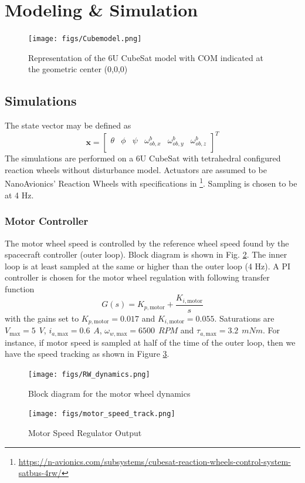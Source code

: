 \section{Modeling \& Simulation} \label{sec:simulations}
\begin{figure}[htbp]
  \centering
    \texttt{[image: figs/Cubemodel.png]}
    \caption{Representation of the 6U CubeSat model with COM indicated at the geometric center (0,0,0)}
    \label{fig:cubesat_model}
\end{figure}
\subsection{Simulations} \label{sec:simulations}
The state vector may be defined as
\begin{equation}
   \mathbf{x} = \begin{bmatrix}
   \theta & \phi & \psi & \omega^{b}_{ob,x} & \omega^{b}_{ob,y} & \omega^{b}_{ob,z} \\
   \end{bmatrix}^{T}
\end{equation}
The simulations are performed on a 6U CubeSat with tetrahedral configured reaction wheels without disturbance model. Actuators are assumed to be NanoAvionics' Reaction Wheels with specifications in \footnote{\url{https://n-avionics.com/subsystems/cubesat-reaction-wheels-control-system-satbus-4rw/}}. Sampling is chosen to be at 4 Hz.

\subsubsection{Motor Controller}
The motor wheel speed is controlled by the reference wheel speed found by the spacecraft controller (outer loop). Block diagram is shown in Fig. \ref{fig:RW_dynamics}. The inner loop is at least sampled at the same or higher than the outer loop (4 Hz). A PI controller is chosen for the motor wheel regulation with following transfer function
\begin{equation}
G(s)=K_{p,\text{motor}}+\frac{K_{i,\text{motor}}}{s}
\end{equation}
with the gains set to $K_{p,\text{motor}}=0.017$ and $K_{i,\text{motor}}=0.055$. Saturations are $V_{\text{max}}=5 \hspace{5pt} V$, $i_{a,\text{max}}=0.6 \hspace{5pt} A$, $\omega_{w,{\text{max}}}=6500 \hspace{5pt} RPM$ and $\tau_{a,{\text{max}}}=3.2 \hspace{5pt} mNm$. For instance, if motor speed is sampled at half of the time of the outer loop, then we have the speed tracking as shown in Figure \ref{fig:motor_speed_track}.
\begin{figure}[htbp]
  \centering
    \texttt{[image: figs/RW\_dynamics.png]}
    \caption{Block diagram for the motor wheel dynamics}
    \label{fig:RW_dynamics}
\end{figure}
\begin{figure}[htbp]
        \centering
        \texttt{[image: figs/motor\_speed\_track.png]}
		    \caption{Motor Speed Regulator Output}
		\label{fig:motor_speed_track}
		\end{figure}
